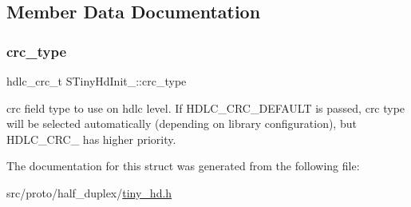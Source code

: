 \subsection{Member Data Documentation}
\mbox{\label{structSTinyHdInit___a520f9fbb19f5ec84f3f86a10d819faf4}} 
\subsubsection{\texorpdfstring{crc\+\_\+type}{crc\_type}}
{\footnotesize\ttfamily hdlc\+\_\+crc\+\_\+t S\+Tiny\+Hd\+Init\+\_\+\+::crc\+\_\+type}

crc field type to use on hdlc level. If H\+D\+L\+C\+\_\+\+C\+R\+C\+\_\+\+D\+E\+F\+A\+U\+LT is passed, crc type will be selected automatically (depending on library configuration), but H\+D\+L\+C\+\_\+\+C\+R\+C\+\_ has higher priority. 

The documentation for this struct was generated from the following file\+:\begin{DoxyCompactItemize}
\item 
src/proto/half\+\_\+duplex/\hyperlink{tiny__hd_8h}{tiny\+\_\+hd.\+h}\end{DoxyCompactItemize}
